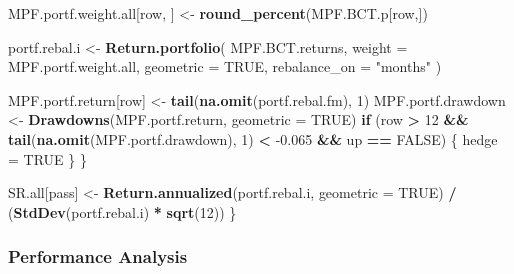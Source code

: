 \documentclass[]{article}
\newenvironment{Shaded}{\begin{snugshade}}{\end{snugshade}}
\newcommand{\ControlFlowTok}[1]{\textcolor[rgb]{0.13,0.29,0.53}{\textbf{#1}}}
\newcommand{\DataTypeTok}[1]{\textcolor[rgb]{0.13,0.29,0.53}{#1}}
\newcommand{\DecValTok}[1]{\textcolor[rgb]{0.00,0.00,0.81}{#1}}
\newcommand{\FloatTok}[1]{\textcolor[rgb]{0.00,0.00,0.81}{#1}}
\newcommand{\KeywordTok}[1]{\textcolor[rgb]{0.13,0.29,0.53}{\textbf{#1}}}
\newcommand{\NormalTok}[1]{#1}
\newcommand{\OperatorTok}[1]{\textcolor[rgb]{0.81,0.36,0.00}{\textbf{#1}}}
\newcommand{\OtherTok}[1]{\textcolor[rgb]{0.56,0.35,0.01}{#1}}
\newcommand{\StringTok}[1]{\textcolor[rgb]{0.31,0.60,0.02}{#1}}
\begin{document}
\begin{Shaded}
\begin{Highlighting}[]
\NormalTok{    MPF.portf.weight.all[row, ] <-}
\StringTok{      }\KeywordTok{round_percent}\NormalTok{(MPF.BCT.p[row,])}
    
\NormalTok{    portf.rebal.i <-}
\StringTok{      }\KeywordTok{Return.portfolio}\NormalTok{(}
\NormalTok{        MPF.BCT.returns,}
        \DataTypeTok{weight =}\NormalTok{ MPF.portf.weight.all,}
        \DataTypeTok{geometric =} \OtherTok{TRUE}\NormalTok{,}
        \DataTypeTok{rebalance_on =} \StringTok{"months"}
\NormalTok{      )}
    
\NormalTok{    MPF.portf.return[row] <-}\StringTok{ }\KeywordTok{tail}\NormalTok{(}\KeywordTok{na.omit}\NormalTok{(portf.rebal.fm), }\DecValTok{1}\NormalTok{)}
\NormalTok{    MPF.portf.drawdown <-}\StringTok{ }\KeywordTok{Drawdowns}\NormalTok{(MPF.portf.return,}
                                    \DataTypeTok{geometric =} \OtherTok{TRUE}\NormalTok{)}
    \ControlFlowTok{if}\NormalTok{ (row }\OperatorTok{>}\StringTok{ }\DecValTok{12} \OperatorTok{&&}\StringTok{ }\KeywordTok{tail}\NormalTok{(}\KeywordTok{na.omit}\NormalTok{(MPF.portf.drawdown), }\DecValTok{1}\NormalTok{) }\OperatorTok{<}\StringTok{ }\FloatTok{-0.065} \OperatorTok{&&}
\StringTok{        }\NormalTok{up }\OperatorTok{==}\StringTok{ }\OtherTok{FALSE}\NormalTok{) \{}
\NormalTok{      hedge =}\StringTok{ }\OtherTok{TRUE}
\NormalTok{    \}}
\NormalTok{  \}}
  
  
  
\NormalTok{  SR.all[pass] <-}
\StringTok{    }\KeywordTok{Return.annualized}\NormalTok{(portf.rebal.i, }\DataTypeTok{geometric =} \OtherTok{TRUE}\NormalTok{) }\OperatorTok{/}\StringTok{ }\NormalTok{(}\KeywordTok{StdDev}\NormalTok{(portf.rebal.i) }\OperatorTok{*}\StringTok{ }\KeywordTok{sqrt}\NormalTok{(}\DecValTok{12}\NormalTok{))}
\NormalTok{\}}
\end{Highlighting}
\end{Shaded}

\hypertarget{performance-analysis}{%
\subsubsection{Performance Analysis}\label{performance-analysis}}
\end{document}
